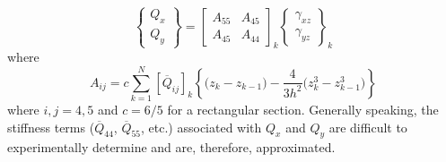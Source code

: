 \documentclass{article}
\begin{document}
\begin{equation}
    \left\{ \begin{array}{c} Q_{x} \\ Q_{y} \end{array} \right\} =
    \left[ \begin{array}{cc} A_{55} & A_{45} \\ A_{45} & A_{44} \end{array} \right]_{k}
    \left\{ \begin{array}{c} \gamma_{xz} \\ \gamma_{yz} \end{array} \right\}_{k}
\end{equation}
where
\begin{equation}
    A_{ij} = c \sum_{k=1}^{N} \left[ \overline{Q}_{ij} \right]_{k} \left\{ \big(z_{k} - z_{k-1} \big) - \frac{4}{3h^{2}} \big(z_{k}^3 - z_{k-1}^3 \big) \right\}
\end{equation}
where $i,j=4,5$ and $c=6/5$ for a rectangular section. Generally speaking, the stiffness terms ($\overline{Q}_{44}$, $\overline{Q}_{55}$, etc.) associated with $Q_{x}$ and $Q_{y}$ are difficult to experimentally determine and are, therefore, approximated.
\end{document}
